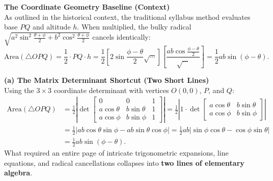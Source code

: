 \begin{solution}
\textbf{The Coordinate Geometry Baseline (Context)} \\
As outlined in the historical context, the traditional syllabus method evaluates base $PQ$ and altitude $h$. When multiplied, the bulky radical $\sqrt{a^2\sin^2\frac{\theta+\phi}{2} + b^2\cos^2\frac{\theta+\phi}{2}}$ cancels identically:
\[
\text{Area}(\triangle OPQ) = \frac{1}{2} \cdot PQ \cdot h = \frac{1}{2} \left[2\sin\frac{\phi-\theta}{2}\sqrt{\cdots}\right]\left[\frac{ab\cos\frac{\phi-\theta}{2}}{\sqrt{\cdots}}\right] = \frac{1}{2}ab\sin(\phi - \theta).
\]

\textbf{(a) The Matrix Determinant Shortcut (Two Short Lines)} \\
Using the $3 \times 3$ coordinate determinant with vertices $O(0,0)$, $P$, and $Q$:
\begin{align*}
\text{Area}(\triangle OPQ) &= \frac{1}{2} \left| \det \begin{bmatrix} 0 & 0 & 1 \\ a\cos\theta & b\sin\theta & 1 \\ a\cos\phi & b\sin\phi & 1 \end{bmatrix} \right|
= \frac{1}{2} \left| 1 \cdot \det \begin{bmatrix} a\cos\theta & b\sin\theta \\ a\cos\phi & b\sin\phi \end{bmatrix} \right| \\[2pt]
&= \frac{1}{2} | ab\cos\theta\sin\phi - ab\sin\theta\cos\phi | = \frac{1}{2}ab | \sin\phi\cos\theta - \cos\phi\sin\theta | \\[2pt]
&= \frac{1}{2}ab \sin(\phi - \theta).
\end{align*}
What required an entire page of intricate trigonometric expansions, line equations, and radical cancellations collapses into \textbf{two lines of elementary algebra}.


\end{solution}
